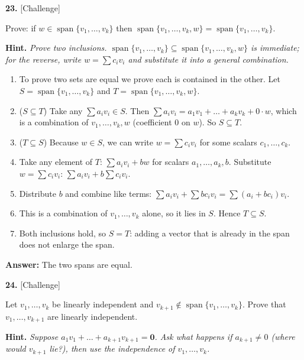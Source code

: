 \documentclass[11pt]{article}
\begin{document}
\par\vspace{2pt}
\begin{minipage}{\linewidth}\textbf{23.} \hfill{\scriptsize\color{ink}[Challenge]}\par\nopagebreak Prove: if $w\in\operatorname{span}\{v_1,\dots,v_k\}$ then $\operatorname{span}\{v_1,\dots,v_k,w\}=\operatorname{span}\{v_1,\dots,v_k\}$.
\par\smallskip\begingroup\small\color{ink}\textbf{Hint.} \textit{Prove two inclusions. $\operatorname{span}\{v_1,\dots,v_k\}\subseteq\operatorname{span}\{v_1,\dots,v_k,w\}$ is immediate; for the reverse, write $w=\sum c_iv_i$ and substitute it into a general combination.}\endgroup
\end{minipage}\par\nopagebreak
\begin{tcolorbox}[breakable,colback=ans,colframe=ansb,boxrule=0.5pt,left=4pt,right=4pt,top=2pt,bottom=2pt]\begin{enumerate}[leftmargin=2.2em,itemsep=1pt,topsep=1pt,label=\textbf{Step \arabic*.}]\item To prove two sets are equal we prove each is contained in the other. Let $S=\operatorname{span}\{v_1,\dots,v_k\}$ and $T=\operatorname{span}\{v_1,\dots,v_k,w\}$.
\item ($S\subseteq T$) Take any $\sum a_iv_i\in S$. Then $\sum a_iv_i=a_1v_1+\dots+a_kv_k+0\cdot w$, which is a combination of $v_1,\dots,v_k,w$ (coefficient $0$ on $w$). So $S\subseteq T$.
\item ($T\subseteq S$) Because $w\in S$, we can write $w=\sum c_iv_i$ for some scalars $c_1,\dots,c_k$.
\item Take any element of $T$: $\sum a_iv_i+bw$ for scalars $a_1,\dots,a_k,b$. Substitute $w=\sum c_iv_i$: $\sum a_iv_i+b\sum c_iv_i$.
\item Distribute $b$ and combine like terms: $\sum a_iv_i+\sum bc_iv_i=\sum(a_i+bc_i)v_i$.
\item This is a combination of $v_1,\dots,v_k$ alone, so it lies in $S$. Hence $T\subseteq S$.
\item Both inclusions hold, so $S=T$: adding a vector that is already in the span does not enlarge the span.
\end{enumerate}\textbf{Answer:} The two spans are equal.\end{tcolorbox}
\par\vspace{2pt}
\begin{minipage}{\linewidth}\textbf{24.} \hfill{\scriptsize\color{ink}[Challenge]}\par\nopagebreak Let $v_1,\dots,v_k$ be linearly independent and $v_{k+1}\notin\operatorname{span}\{v_1,\dots,v_k\}$. Prove that $v_1,\dots,v_{k+1}$ are linearly independent.
\par\smallskip\begingroup\small\color{ink}\textbf{Hint.} \textit{Suppose $a_1v_1+\dots+a_{k+1}v_{k+1}=\mathbf 0$. Ask what happens if $a_{k+1}\neq0$ (where would $v_{k+1}$ lie?), then use the independence of $v_1,\dots,v_k$.}\endgroup
\end{minipage}\par\nopagebreak
\end{document}
